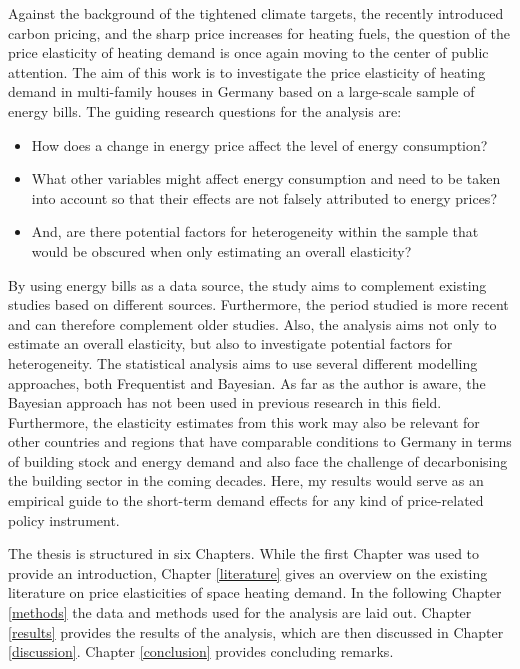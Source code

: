 \documentclass[12pt,twoside]{reedthesis}
\providecommand{\tightlist}{%
  \setlength{\itemsep}{0pt}\setlength{\parskip}{0pt}}
\begin{document}
Against the background of the tightened climate targets, the recently introduced carbon pricing, and the sharp price increases for heating fuels, the question of the price elasticity of heating demand is once again moving to the center of public attention. The aim of this work is to investigate the price elasticity of heating demand in multi-family houses in Germany based on a large-scale sample of energy bills. The guiding research questions for the analysis are:
\begin{itemize}
\tightlist
\item
  How does a change in energy price affect the level of energy consumption?
\item
  What other variables might affect energy consumption and need to be taken into account so that their effects are not falsely attributed to energy prices?
\item
  And, are there potential factors for heterogeneity within the sample that would be obscured when only estimating an overall elasticity?
\end{itemize}
By using energy bills as a data source, the study aims to complement existing studies based on different sources. Furthermore, the period studied is more recent and can therefore complement older studies. Also, the analysis aims not only to estimate an overall elasticity, but also to investigate potential factors for heterogeneity. The statistical analysis aims to use several different modelling approaches, both Frequentist and Bayesian. As far as the author is aware, the Bayesian approach has not been used in previous research in this field. Furthermore, the elasticity estimates from this work may also be relevant for other countries and regions that have comparable conditions to Germany in terms of building stock and energy demand and also face the challenge of decarbonising the building sector in the coming decades. Here, my results would serve as an empirical guide to the short-term demand effects for any kind of price-related policy instrument.

The thesis is structured in six Chapters. While the first Chapter was used to provide an introduction, Chapter \ref{literature} gives an overview on the existing literature on price elasticities of space heating demand. In the following Chapter \ref{methods} the data and methods used for the analysis are laid out. Chapter \ref{results} provides the results of the analysis, which are then discussed in Chapter \ref{discussion}. Chapter \ref{conclusion} provides concluding remarks.
\end{document}
